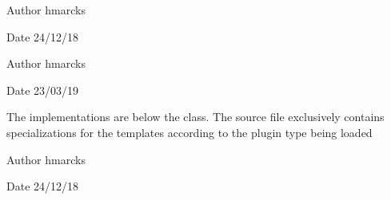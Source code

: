 \begin{DoxyAuthor}{Author}
hmarcks
\end{DoxyAuthor}
\begin{DoxyDate}{Date}
24/12/18
\end{DoxyDate}
\begin{DoxyAuthor}{Author}
hmarcks
\end{DoxyAuthor}
\begin{DoxyDate}{Date}
23/03/19
\end{DoxyDate}
The implementations are below the class. The source file exclusively contains specializations for the templates according to the plugin type being loaded

\begin{DoxyAuthor}{Author}
hmarcks
\end{DoxyAuthor}
\begin{DoxyDate}{Date}
24/12/18 
\end{DoxyDate}

